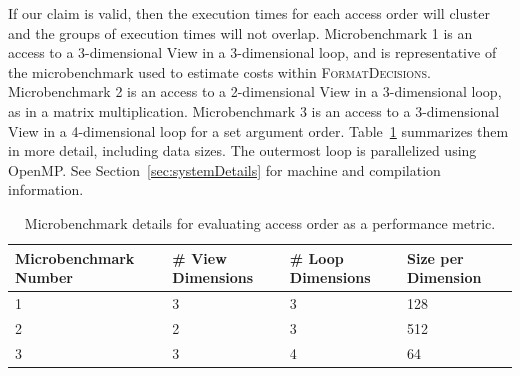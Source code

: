 \documentclass[sigconf,review=true]{acmart}
\newcommand{\FormatDecisions}[0]{{\textsc{FormatDecisions}}}
\begin{document}
If our claim is valid, then the execution times for each access order will cluster and the groups of execution times will not overlap.
Microbenchmark 1 is an access to a 3-dimensional View in a 3-dimensional loop, and is representative of the microbenchmark used to estimate costs within \FormatDecisions. 
Microbenchmark 2 is an access to a 2-dimensional View in a 3-dimensional loop, as in a matrix multiplication.
Microbenchmark 3 is an access to a 3-dimensional View in a 4-dimensional loop for a set argument order.
Table~\ref{MicrobenchmarkDetails} summarizes them in more detail, including data sizes.
The outermost loop is parallelized using OpenMP.
See Section~\ref{sec:systemDetails} for machine and compilation information.
\label{sec:AccessMetric}
\begin{table}
	\centering
	\begin{tabular}{|p{2.2cm}|p{1.6cm}|p{1.6cm}|p{1.5cm}|}
		\hline
		\raggedright Microbenchmark \linebreak Number & \raggedright \# View \linebreak Dimensions & \raggedright \# Loop \linebreak Dimensions & \raggedright Size per \linebreak Dimension \tabularnewline
		\hline
		1 & 3 & 3 & 128 \\
		2 & 2 & 3 & 512 \\
		3 & 3 & 4 & 64 \\
		\hline
	\end{tabular}
	\caption{Microbenchmark details for evaluating access order as a performance metric.}
	\label{MicrobenchmarkDetails}
\end{table}
\end{document}
